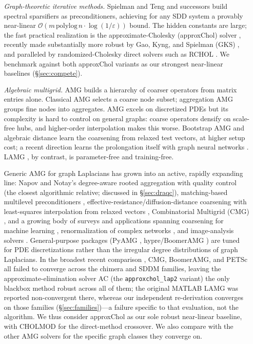\documentclass{siamart220329}
\begin{document}
\emph{Graph-theoretic iterative methods.} Spielman and Teng \cite{spielman-teng} and
successors \cite{kelner-stoc} build spectral sparsifiers as preconditioners, achieving
for any SDD system a provably near-linear $\mathcal{O}(m\,\mathrm{polylog}\,n\cdot\log(1/\varepsilon))$ bound. The hidden constants are large; the fast practical realization is the
approximate-Cholesky (approxChol) solver \cite{kelner-stoc,laplacians}, recently made
substantially more robust by Gao, Kyng, and Spielman (GKS) \cite{gks2023}, and paralleled by randomized-Cholesky direct
solvers such as RCHOL \cite{rchol}. We benchmark against both approxChol variants as
our strongest near-linear baselines (\S\ref{sec:compete}).

\emph{Algebraic multigrid.} AMG \cite{brandt-amg,ruge-stuben} builds a hierarchy of coarser
operators from matrix entries alone. Classical AMG selects a coarse node subset; aggregation
AMG \cite{vanek-mandel-brezina,notay} groups fine nodes into aggregates. AMG excels on
discretized PDEs but its complexity is hard to control on general graphs: coarse operators
densify on scale-free hubs, and higher-order interpolation makes this worse. Bootstrap AMG
\cite{brandt-bootstrap} and algebraic distance \cite{ron-safro-brandt} learn the coarsening from
relaxed test vectors, at higher setup cost; a recent direction learns the prolongation itself with
graph neural networks \cite{learned-amg}. LAMG \cite{lamg}, by contrast, is parameter-free and
training-free.

Generic AMG for graph Laplacians has grown into an active, rapidly expanding line:
Napov and Notay's degree-aware rooted aggregation with quality control \cite{napov-notay} (the
closest algorithmic relative; discussed in \S\ref{sec:draqc}), matching-based multilevel
preconditioners \cite{brannick-match}, effective-resistance/diffusion-distance coarsening with
least-squares interpolation from relaxed vectors \cite{lee2024}, Combinatorial Multigrid (CMG)
\cite{cmg}, and a growing body of surveys and applications spanning coarsening for machine
learning \cite{chen-saad-coarsening}, renormalization of complex networks
\cite{laplacian-coarsegrain}, and image-analysis solvers \cite{he-image-amg}. General-purpose
packages (PyAMG \cite{pyamg}, hypre/BoomerAMG \cite{boomeramg}) are tuned for PDE
discretizations rather than the irregular degree distributions of graph Laplacians. In the
broadest recent comparison \cite{gks2023}, CMG, BoomerAMG, and PETSc all failed to converge
across the chimera and SDDM families, leaving the approximate-elimination solver AC (the
\texttt{approxchol\_lap2} variant) the only blackbox method robust across all of them; the
original MATLAB LAMG was reported non-convergent there, whereas our independent re-derivation
converges on those families (\S\ref{sec:families})---a failure specific to that evaluation, not
the algorithm. We thus consider approxChol as our sole robust near-linear baseline, with CHOLMOD
for the direct-method crossover. We also compare with the other AMG solvers for the specific
graph classes they converge on.
\end{document}
